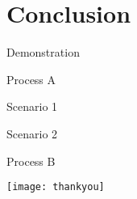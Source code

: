 						 	
\section{Conclusion}


			
\begin{frame}{Demonstration}
	\begin{block}{Process A}
	\end{block}
	\begin{block}{Scenario 1}
	\end{block}
	\begin{alertblock}{Scenario 2}
	\end{alertblock}
	\begin{block}{Process B}
	\end{block}
	\note{}
\end{frame}
											 			
\begin{frame}
	\centering
	\texttt{[image: thankyou]}
	\note{}
\end{frame}